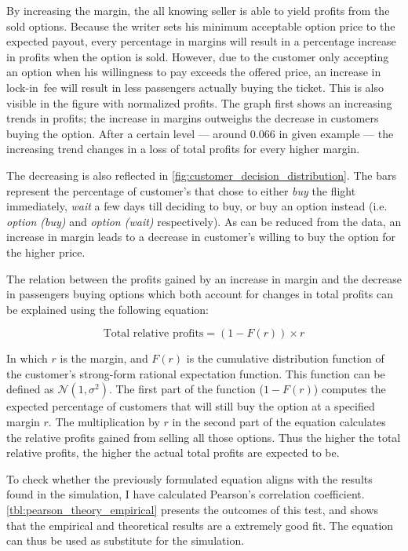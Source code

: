 
By increasing the margin, the all knowing seller is able to yield profits from the sold options. Because the writer sets his minimum acceptable option price to the expected payout, every percentage in margins will result in a percentage increase in profits when the option is sold. However, due to the customer only accepting an option when his willingness to pay exceeds the offered price, an increase in lock-in~fee will result in less passengers actually buying the ticket. This is also visible in the figure with normalized profits. The graph first shows an increasing trends in profits; the increase in margins outweighs the decrease in customers buying the option. After a certain level --- around 0.066 in given example --- the increasing trend changes in a loss of total profits for every higher margin.

The decreasing is also reflected in \autoref{fig:customer_decision_distribution}. The bars represent the percentage of customer's that chose to either \emph{buy} the flight immediately, \emph{wait} a few days till deciding to buy, or buy an option instead (i.e. \emph{option (buy)} and \emph{option (wait)} respectively). As can be reduced from the data, an increase in margin leads to a decrease in customer's willing to buy the option for the higher price.


The relation between the profits gained by an increase in margin and the decrease in passengers buying options which both account for changes in total profits can be explained using the following equation:

$$ \mbox{Total relative profits} = (1 - F(r)) \times r $$

In which $r$ is the margin, and $F(r)$ is the cumulative distribution function of the customer's strong-form rational expectation function. This function can be defined as $\mathcal{N}(1, \sigma^2)$. The first part of the function ($1 - F(r)$) computes the expected percentage of customers that will still buy the option at a specified margin $r$. The multiplication by $r$ in the second part of the equation calculates the relative profits gained from selling all those options. Thus the higher the total relative profits, the higher the actual total profits are expected to be.

To check whether the previously formulated equation aligns with the results found in the simulation, I have calculated Pearson's correlation coefficient. \autoref{tbl:pearson_theory_empirical} presents the outcomes of this test, and shows that the empirical and theoretical results are a extremely good fit. The equation can thus be used as substitute for the simulation.


